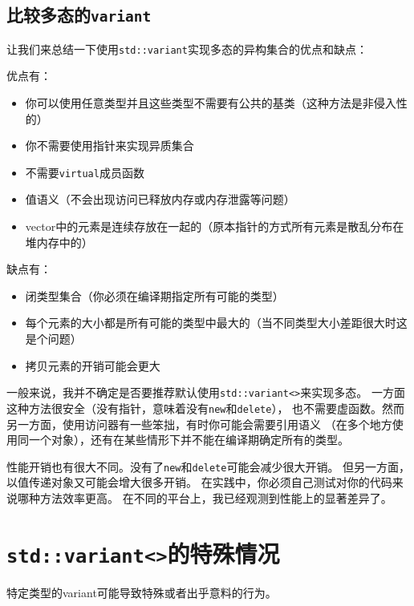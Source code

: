 \subsection{比较多态的\texttt{variant}}
让我们来总结一下使用\texttt{std::variant}实现多态的异构集合的优点和缺点：

优点有：
\begin{itemize}
    \item 你可以使用任意类型并且这些类型不需要有公共的基类（这种方法是非侵入性的）
    \item 你不需要使用指针来实现异质集合
    \item 不需要\texttt{virtual}成员函数
    \item 值语义（不会出现访问已释放内存或内存泄露等问题）
    \item vector中的元素是连续存放在一起的（原本指针的方式所有元素是散乱分布在堆内存中的）
\end{itemize}
缺点有：
\begin{itemize}
    \item 闭类型集合（你必须在编译期指定所有可能的类型）
    \item 每个元素的大小都是所有可能的类型中最大的（当不同类型大小差距很大时这是个问题）
    \item 拷贝元素的开销可能会更大
\end{itemize}
一般来说，我并不确定是否要推荐默认使用\texttt{std::variant<>}来实现多态。
一方面这种方法很安全（没有指针，意味着没有\texttt{new}和\texttt{delete}），
也不需要虚函数。然而另一方面，使用访问器有一些笨拙，有时你可能会需要引用语义
（在多个地方使用同一个对象），还有在某些情形下并不能在编译期确定所有的类型。

性能开销也有很大不同。没有了\texttt{new}和\texttt{delete}可能会减少很大开销。
但另一方面，以值传递对象又可能会增大很多开销。
在实践中，你必须自己测试对你的代码来说哪种方法效率更高。
在不同的平台上，我已经观测到性能上的显著差异了。


\section{\texttt{std::variant<>}的特殊情况}\label{ch16.5}
特定类型的variant可能导致特殊或者出乎意料的行为。

